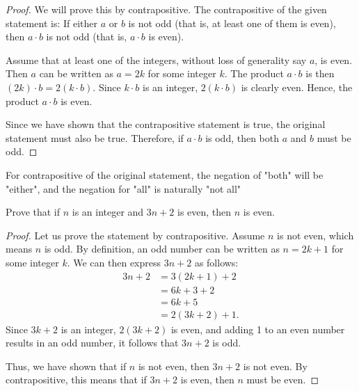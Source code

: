\documentclass[
	12pt, %
	fleqn, %
	a4paper, %
]{LegrandOrangeBook}
\begin{document}
\begin{proof}
We will prove this by contrapositive. The contrapositive of the given statement is: If either \( a \) or \( b \) is not odd (that is, at least one of them is even), then \( a \cdot b \) is not odd (that is, \( a \cdot b \) is even).

Assume that at least one of the integers, without loss of generality say \( a \), is even. Then \( a \) can be written as \( a = 2k \) for some integer \( k \). The product \( a \cdot b \) is then \( (2k) \cdot b = 2(k \cdot b) \). Since \( k \cdot b \) is an integer, \( 2(k \cdot b) \) is clearly even. Hence, the product \( a \cdot b \) is even.

Since we have shown that the contrapositive statement is true, the original statement must also be true. Therefore, if \( a \cdot b \) is odd, then both \( a \) and \( b \) must be odd.
\end{proof}
\begin{remark}
    For contrapositive of the original statement, the negation of "both" will be  "either", and the negation for "all" is naturally "not all"  
\end{remark}

\begin{exercise}
Prove that if \( n \) is an integer and \( 3n + 2 \) is even, then \( n \) is even.
\end{exercise}

\begin{proof}
Let us prove the statement by contrapositive. Assume \( n \) is not even, which means \( n \) is odd. By definition, an odd number can be written as \( n = 2k + 1 \) for some integer \( k \). We can then express \( 3n + 2 \) as follows:
\begin{align*}
3n + 2 &= 3(2k + 1) + 2 \\
&= 6k + 3 + 2 \\
&= 6k + 5 \\
&= 2(3k + 2) + 1.
\end{align*}
Since \( 3k + 2 \) is an integer, \( 2(3k + 2) \) is even, and adding 1 to an even number results in an odd number, it follows that \( 3n + 2 \) is odd.

Thus, we have shown that if \( n \) is not even, then \( 3n + 2 \) is not even. By contrapositive, this means that if \( 3n + 2 \) is even, then \( n \) must be even.
\end{proof}
\end{document}
